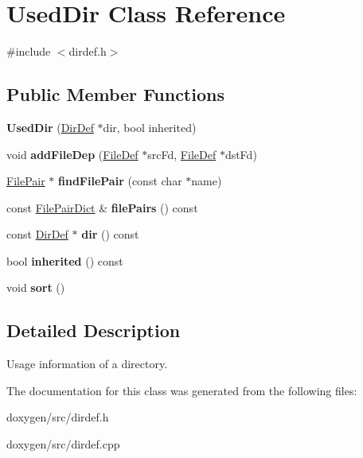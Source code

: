 \hypertarget{class_used_dir}{}\section{Used\+Dir Class Reference}
\label{class_used_dir}


{\ttfamily \#include $<$dirdef.\+h$>$}

\subsection*{Public Member Functions}
\begin{DoxyCompactItemize}
\item 
\mbox{\label{class_used_dir_a46516c4ec3cea28c6fa305b15ba0ffee}} 
{\bfseries Used\+Dir} (\mbox{\hyperlink{class_dir_def}{Dir\+Def}} $\ast$dir, bool inherited)
\item 
\mbox{\label{class_used_dir_ae5ae1dc265b0d82b60ffe52938bf549b}} 
void {\bfseries add\+File\+Dep} (\mbox{\hyperlink{class_file_def}{File\+Def}} $\ast$src\+Fd, \mbox{\hyperlink{class_file_def}{File\+Def}} $\ast$dst\+Fd)
\item 
\mbox{\label{class_used_dir_ac420432f250c5c034c3bfc60d65099a1}} 
\mbox{\hyperlink{class_file_pair}{File\+Pair}} $\ast$ {\bfseries find\+File\+Pair} (const char $\ast$name)
\item 
\mbox{\label{class_used_dir_a827ba455a638ac9ded42b3cbe204729e}} 
const \mbox{\hyperlink{class_file_pair_dict}{File\+Pair\+Dict}} \& {\bfseries file\+Pairs} () const
\item 
\mbox{\label{class_used_dir_a8a214815b4266c1f48493d2c0e877f65}} 
const \mbox{\hyperlink{class_dir_def}{Dir\+Def}} $\ast$ {\bfseries dir} () const
\item 
\mbox{\label{class_used_dir_aaa107e4ab81d8d7d7425629a9d4d3283}} 
bool {\bfseries inherited} () const
\item 
\mbox{\label{class_used_dir_a24c2c709540ee61b987ae5b80d0b4ec3}} 
void {\bfseries sort} ()
\end{DoxyCompactItemize}


\subsection{Detailed Description}
Usage information of a directory. 

The documentation for this class was generated from the following files\+:\begin{DoxyCompactItemize}
\item 
doxygen/src/dirdef.\+h\item 
doxygen/src/dirdef.\+cpp\end{DoxyCompactItemize}
